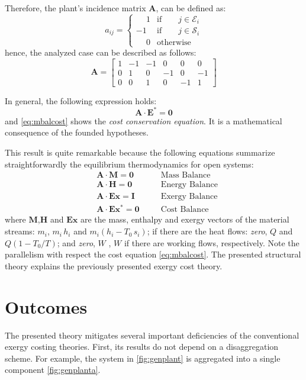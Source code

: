 \documentclass[energies,article,submit,moreauthors,pdftex]{Definitions/mdpi}
\newcommand{\vm}[1]{\ensuremath{\mathbf{#1}}}
\begin{document}
Therefore, the plant's incidence matrix $\vm{A}$, can be defined as:
\begin{equation}
    a_{ij}=\begin{cases}
    \phantom{-}1 & \text{if}\qquad j\in\mathcal{E}_i \\
    -1 & \text{if}\qquad j\in\mathcal{S}_i \\
    \phantom{-}0 & \text{otherwise}
    \end{cases}
\end{equation}
hence, the analyzed case can be described as follows:
\begin{equation*}
    \vm{A}=\left[\begin{array}{rrrrrr}
    1 & -1 & -1 &  0 &  0 &  0 \\
    0 &  1 &  0 & -1 &  0 & -1 \\
    0 &  0 &  1 &  0 & -1 &  1
    \end{array}\right]
\end{equation*}

In general, the following expression holds:
\begin{equation}
    \vm{A} \cdot \vm{E}^{*} = \vm{0}
    \label{eq:mbalcost}
\end{equation}
and \cref{eq:mbalcost} shows the \emph{cost conservation equation}. It is a mathematical consequence of the founded hypotheses.

This result is quite remarkable because the following equations summarize straightforwardly the equilibrium thermodynamics for open systems:
\begin{align}
    &\vm{A}\cdot\vm{M} = \vm{0} &\quad & \text{Mass Balance} \label{eq:a1} \\
    &\vm{A}\cdot\vm{H} = \vm{0} &\quad & \text{Energy Balance} \label{eq:a2}\\
    &\vm{A}\cdot\vm{Ex} = \vm{I} &\quad & \text{Exergy Balance} \label{eq:a3}\\
    &\vm{A}\cdot\vm{Ex^*} = \vm{0} &\quad & \text{Cost Balance} \label{eq:a4}
\end{align}
where \vm{M},\vm{H} and \vm{Ex} are the mass, enthalpy and exergy vectors of the material streams: $m_i$, $m_i\,h_i$ and $m_i(h_i-T_0\,s_i)$; if there are the heat flows: \emph{zero}, $Q$ and $Q(1-T_0/T)$; and \emph{zero}, $W$ , $W$ if there are working flows, respectively. Note the  parallelism with respect the cost equation \eqref{eq:mbalcost}. The presented structural theory explains the previously presented exergy cost theory.

\section{Outcomes}
The presented theory mitigates several important deficiencies of the conventional exergy costing theories. First, its results do not depend on a disaggregation scheme. For example, the system in \cref{fig:genplant} is aggregated into a single component \cref{fig:genplanta}.
\end{document}
